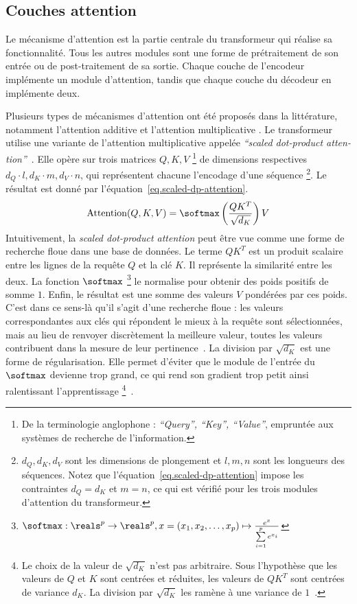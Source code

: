 \subsection{Couches attention}

Le mécanisme d'attention est la partie centrale du transformeur qui réalise sa fonctionnalité.
Tous les autres modules sont une forme de prétraitement de son entrée ou de post-traitement de sa sortie. 
Chaque couche de l'encodeur implémente un module d'attention, 
tandis que chaque couche du décodeur en implémente deux.

Plusieurs types de mécanismes d'attention ont été proposés dans la littérature,
notamment l'attention additive \cite{Bahdanau_Cho_Bengio_2016} 
et l'attention multiplicative \cite{Luong_Pham_Manning_2015}.
Le transformeur utilise une variante de l'attention multiplicative appelée 
\foreignlanguage{english}{\emph{``scaled dot-product attention''}}~\cite{attention}.
Elle opère sur trois matrices \(Q, K, V\)%
\footnote{%
    De la terminologie anglophone : \foreignlanguage{english}{\emph{``Query'', ``Key'', ``Value''}},
    empruntée aux systèmes de recherche de l'information.
} de dimensions respectives \(d_Q \cdot l, d_K \cdot m, d_V \cdot n\),
qui représentent chacune l'encodage d'une séquence%
\footnote{
    \(d_Q, d_K, d_V\) sont les dimensions de plongement et \(l, m, n\) sont les longueurs des séquences.
    Notez que l'équation~\eqref{eq.scaled-dp-attention} impose les contraintes \(d_Q = d_K\) et \(m = n\),
    ce qui est vérifié pour les trois modules d'attention du transformeur.
}.
Le résultat est donné par l'équation~\eqref{eq.scaled-dp-attention}.
\begin{eqnarray}
    \label{eq.scaled-dp-attention}
    \text{Attention}(Q, K, V) = \softmax\left(\frac{QK^T}{\sqrt{d_K}}\right)V 
\end{eqnarray}
Intuitivement, la \emph{\foreignlanguage{english}{scaled dot-product attention}} peut être vue comme 
une forme de recherche floue dans une base de données.
Le terme \(QK^T\) est un produit scalaire entre les lignes de la requête \(Q\) et la clé \(K\).
Il représente la similarité entre les deux.
La fonction \(\softmax\)%
\footnote{%
    \(\softmax : \reals^p \to \reals^p, x = (x_1, x_2, \ldots, x_p) \mapsto
    \frac{ e^x}{\sum\limits_{i=1}^p e^{x_i}}\)
} %
le normalise pour obtenir des poids positifs de somme \(1\).
Enfin, le résultat est une somme des valeurs \(V\) pondérées par ces poids.
C'est dans ce sens-là qu'il s'agit d'une recherche floue :
les valeurs correspondantes aux clés qui répondent le mieux à la requête sont sélectionnées,
mais au lieu de renvoyer discrètement la meilleure valeur, 
toutes les valeurs contribuent dans la mesure de leur pertinence~\cite{CS480/680Lecture19_2019}.
La division par \(\sqrt{d_K}\) est une forme de régularisation. 
Elle permet d'éviter que le module de l'entrée du \(\softmax\) devienne trop grand,
ce qui rend son gradient trop petit ainsi ralentissant l'apprentissage%
\footnote{%
    Le choix de la valeur de \(\sqrt{d_K}\) n'est pas arbitraire.
    Sous l'hypothèse que les valeurs de \(Q\) et \(K\) sont centrées et réduites,
    les valeurs de \(QK^T\) sont centrées de variance \(d_K\).
    La division par \(\sqrt{d_K}\) les ramène à une variance de \(1\)~\cite{attention}.
}~\cite{attention}.

